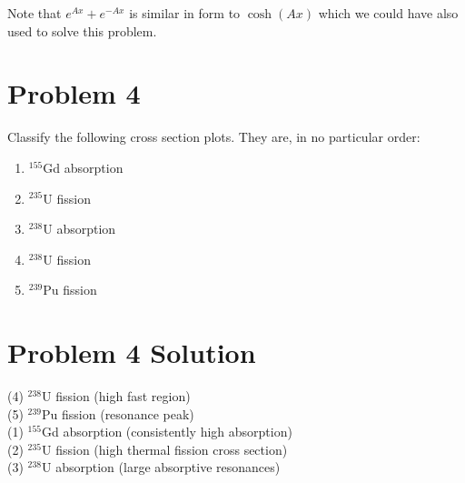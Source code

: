 \documentclass{report}
\newcommand{\tab}{\-\hspace{1.5cm}}
\begin{document}
Note that $e^{Ax} + e^{-Ax}$ is similar in form to $\cosh(Ax)$ which we could have also used to solve this problem.



\newpage
\section*{Problem 4}

Classify the following cross section plots. They are, in no particular order:
\begin{enumerate}[(1)]
\item $^{155}$Gd absorption
\item $^{235}$U fission
\item $^{238}$U absorption
\item $^{238}$U fission
\item $^{239}$Pu fission
\end{enumerate}




\section*{Problem 4 Solution}


\tab\tab (4) $^{238}$U fission (high fast region) 					\\
\tab\tab (5) $^{239}$Pu fission (resonance peak)					\\
\tab\tab (1) $^{155}$Gd absorption (consistently high absorption)	\\
\tab\tab (2) $^{235}$U fission (high thermal fission cross section)	\\
\tab\tab (3) $^{238}$U absorption (large absorptive resonances)
\end{document}
